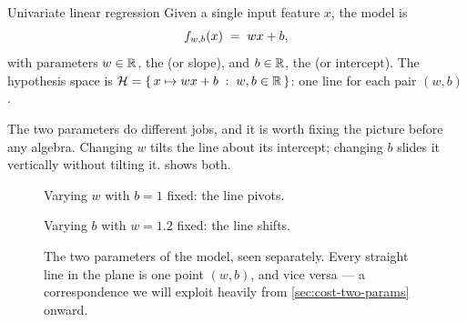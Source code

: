 \begin{defbox}{Univariate linear regression}
Given a single input feature $x$, the  model
is
\[
  f_{w,b}(x) \;=\; wx + b ,
\]
with parameters $w\in\mathbb{R}$, the  (or slope), and $b\in\mathbb{R}$, the
 (or intercept). The hypothesis space is
$\mathcal{H} = \{\,x \mapsto wx+b \;:\; w,b\in\mathbb{R}\,\}$: one line for each pair
$(w,b)$.
\end{defbox}

The two parameters do different jobs, and it is worth fixing the picture before
any algebra. Changing $w$ tilts the line about its intercept; changing $b$
slides it vertically without tilting it.  shows both.

\begin{figure}[htbp]
  \centering
  \begin{minipage}[t]{0.47\linewidth}
    \centering
    {\scriptsize Varying $w$ with $b=1$ fixed: the line pivots.\par}
  \end{minipage}\hfill
  \begin{minipage}[t]{0.47\linewidth}
    \centering
    {\scriptsize Varying $b$ with $w=1.2$ fixed: the line shifts.\par}
  \end{minipage}
  \caption{The two parameters of the model, seen separately. Every straight line
  in the plane is one point $(w,b)$, and vice versa --- a correspondence we will
  exploit heavily from \cref{sec:cost-two-params} onward.}
  \label{fig:wb-effect}
\end{figure}

